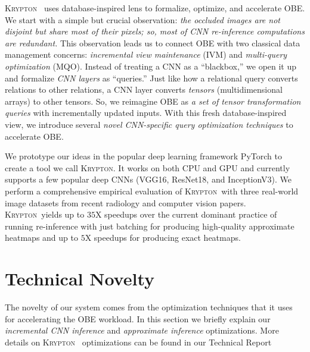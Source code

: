 \documentclass{vldb}
\newcommand{\system}{\textsc{Krypton}}
\begin{document}
\system~ uses database-inspired lens to formalize, optimize, and accelerate OBE. We start with a simple but crucial observation: \textit{the occluded images are not disjoint but share most of their pixels; so, most of CNN re-inference computations are redundant.} This observation leads us to connect OBE with two classical data management concerns: \textit{incremental view maintenance} (IVM) and \textit{multi-query optimization} (MQO). Instead of treating a CNN as a ``blackbox,'' we open it up and formalize \textit{CNN layers} as ``queries.'' Just like how a relational query converts relations to other relations, a CNN layer converts \textit{tensors} (multidimensional arrays) to other tensors. So, we reimagine OBE as \textit{a set of tensor transformation queries} with incrementally updated inputs. With this fresh database-inspired view, we introduce several \textit{novel CNN-specific query optimization techniques} to accelerate OBE.

We prototype our ideas in the popular deep learning framework PyTorch to create a tool we call \system. It works on both CPU and GPU and currently supports a few popular deep CNNs (VGG16, ResNet18, and InceptionV3). We perform a comprehensive empirical evaluation of \system ~with three real-world image datasets from recent radiology and computer vision papers. \system ~yields up to $35$X speedups over the current dominant practice of running re-inference with just batching for producing high-quality approximate heatmaps and up to $5$X speedups for producing exact heatmaps.


\section{Technical Novelty}
The novelty of our system comes from the optimization techniques that it uses for accelerating the OBE workload.
In this section we briefly explain our \textit{incremental CNN inference} and \textit{approximate inference} optimizations.
More details on \system~ optimizations can be found in our Technical Report \cite{krypton}
\end{document}
